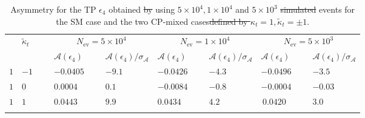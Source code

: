 \documentclass[aps,preprint,tightenlines,floatfix,superscriptaddress,nofootinbib,showpacs]{revtex4-1}
\def\kp{\kappa_t}
\def\kpt{\tilde{\kappa}_t}
\providecommand{\DIFdel}[1]{{\protect\color{red}\sout{#1}}}                      %
\providecommand{\DIFdelbegin}{} %
\providecommand{\DIFdelFL}[1]{\DIFdel{#1}} %
\providecommand{\DIFaddbeginFL}{} %
\providecommand{\DIFaddendFL}{} %
\providecommand{\DIFdelbeginFL}{} %
\providecommand{\DIFdelendFL}{} %
\begin{document}
\begin{table}[th]
\DIFaddendFL \caption{Asymmetry for the TP $\epsilon_4$ obtained \DIFdelbeginFL \DIFdelFL{by }\DIFdelendFL using $5\times
  10^4, 1 \times 10^4$ and $5\times 10^3$ \DIFdelbeginFL \DIFdelFL{simulated }\DIFdelendFL events for the SM
  case and the two $\mathrm{CP}$-mixed cases\DIFdelbeginFL \DIFdelFL{defined by
  $\kp=1,\kpt=\pm 1$}\DIFdelendFL . }
\label{table11}
\begin{center}
\begin{tabular}{|C{1cm}|C{1cm}||C{2cm}|C{2cm}||C{2cm}|C{2cm}||C{2cm}|C{2cm}|}
\hhline{|========|}
 &  &  &  &  \\ 
& & $\mathcal{A}(\epsilon_4)$~~&$\mathcal{A}(\epsilon_4)/\sigma_{\mathcal{A}}$ &  $\mathcal{A}(\epsilon_4)$~~&$\mathcal{A}(\epsilon_4)/\sigma_{\mathcal{A}}$ &  $\mathcal{A}(\epsilon_4)$~~&$\mathcal{A}(\epsilon_4)/\sigma_{\mathcal{A}}$ \\
\hhline{|========|} 
$1$ & $-1$~~~ & $-0.0405$~~~ & $-9.1$~~~ & $-0.0426$~~~ & $-4.3$~~~ & $-0.0496$~~~ & $-3.5$~~~ \\[0.6mm]
\hline
$1$ & $0$ & $0.0004$~ & $0.1$~ & $-0.0084$~~~ & $-0.8$~~~ & $-0.0004$~~~ & $-0.03$~~~ \\[0.6mm]
\hline
$1$ & $1$ & $0.0443$~ & $9.9$~ & $0.0434$~ & $4.2$~ & $\,0.0420$~ & $3.0\,\,$ \\
\hhline{|========|}
\end{tabular}
\end{center} 
\end{table}
\DIFdelbegin %
\DIFdelendFL \DIFaddbeginFL 
\end{document}
